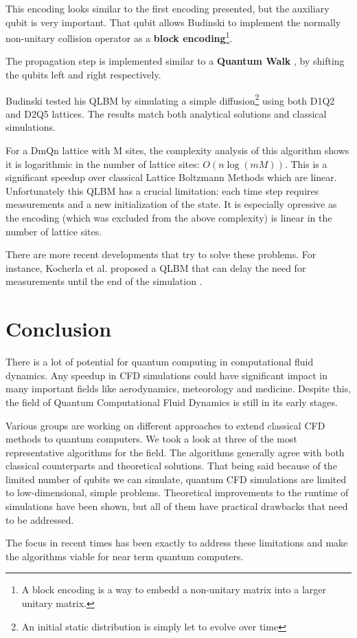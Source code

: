 \documentclass[conference]{IEEEtran}
\begin{document}
This encoding looks similar to the first encoding presented, but the auxiliary qubit is very important.
That qubit allows Budinski to implement the normally non-unitary collision operator as a \textbf{block encoding}\footnote{A block encoding is a way to embedd a non-unitary matrix into a larger unitary matrix.}.

The propagation step is implemented similar to a \textbf{Quantum Walk} \cite{childs2009universal}, by shifting the qubits left and right respectively.

Budinski tested his QLBM by simulating a simple diffusion\footnote{An initial static distribution is simply let to evolve over time} using both D1Q2 and D2Q5 lattices.
The results match both analytical solutions and classical simulations.

For a DmQn lattice with M sites, the complexity analysis of this algorithm shows it is logarithmic in the number of lattice sites: $O(n\log(mM))$. This is a significant speedup over classical Lattice Boltzmann Methods which are linear.
Unfortunately this QLBM has a crucial limitation: each time step requires measurements and a new initialization of the state.
It is especially opressive as the encoding (which was excluded from the above complexity) is linear in the number of lattice sites.

There are more recent developments that try to solve these problems.
For instance, Kocherla et al. proposed a QLBM that can delay the need for measurements until the end of the simulation \cite{kocherla2024fully}.

\section{Conclusion}
There is a lot of potential for quantum computing in computational fluid dynamics.
Any speedup in CFD simulations could have significant impact in many important fields like aerodynamics, meteorology and medicine.
Despite this, the field of Quantum Computational Fluid Dynamics is still in its early stages.

Various groups are working on different approaches to extend classical CFD methods to quantum computers.
We took a look at three of the most representative algorithms for the field.
The algorithms generally agree with both classical counterparts and theoretical solutions.
That being said because of the limited number of qubits we can simulate, quantum CFD simulations are limited to low-dimensional, simple problems.
Theoretical improvements to the runtime of simulations have been shown, but all of them have practical drawbacks that need to be addressed.

The focus in recent times has been exactly to address these limitations and make the algorithms viable for near term quantum computers.



\end{document}
